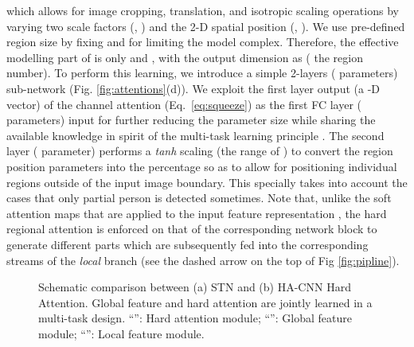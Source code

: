 \documentclass[10pt,twocolumn,letterpaper]{article}
\begin{document}
which allows for image cropping, translation, and isotropic scaling operations
by varying two scale factors (, ) and the 2-D spatial position (, ).
We use pre-defined region size by fixing  and   for limiting the model complex.
Therefore, the effective modelling part of  is 
only  and , with the output dimension 
as  ( the region number).
To perform this learning, we introduce
a simple 2-layers ( parameters) sub-network
(Fig. \ref{fig:attentions}(d)).
We exploit the first layer output (a -D vector) of the channel attention (Eq.~\eqref{eq:squeeze})
as the first FC layer ( parameters) input for further reducing the parameter size 
while sharing the available knowledge
in spirit of the multi-task learning principle \cite{evgeniou2004regularized}.
The second layer ( parameter) performs a \textit{tanh} scaling (the range of )
to convert the region position parameters into the percentage
so as to allow for positioning individual regions outside of the input image boundary.
This specially takes into account the cases that 
only partial person is detected sometimes.
Note that, unlike the soft attention maps that 
are applied to the input feature representation ,
the hard regional attention is enforced on that of the corresponding network block
to generate  different parts which are subsequently fed into the corresponding 
streams of the {\em local} branch
(see the dashed arrow on the top of Fig \ref{fig:pipline}).


\begin{figure} \vskip -0.3cm
	\centering
	\vskip -0.1cm
	\caption{ Schematic comparison between (a) STN \cite{jaderberg2015spatial} 
		and (b) HA-CNN Hard Attention.
		Global feature and hard attention are jointly learned
                in a multi-task design.
		``'': Hard attention module;
		``'': Global feature module; 
		``'': Local feature module.
	}
	\label{fig:stns}
	\vspace{-0.5cm}
\end{figure}
\end{document}
